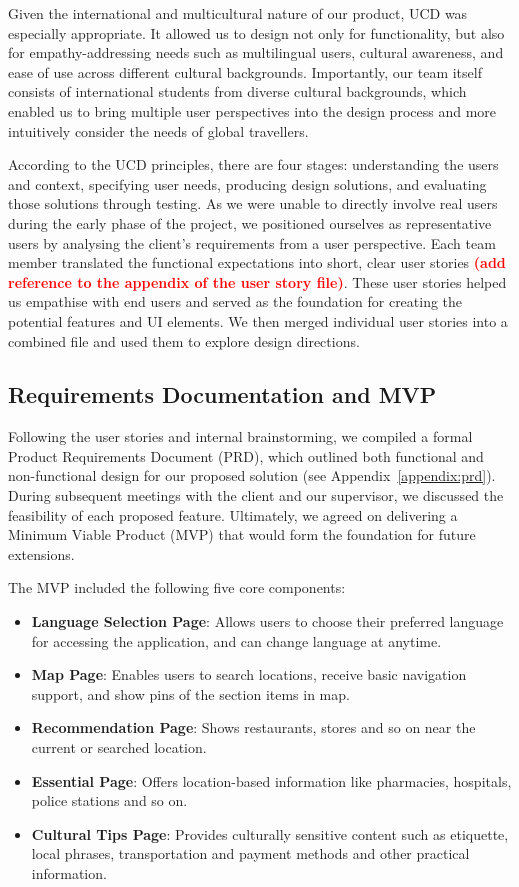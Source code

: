 Given the international and multicultural nature of our product, UCD was especially appropriate. It allowed us to design not only for functionality, but also for empathy-addressing needs such as multilingual users, cultural awareness, and ease of use across different cultural backgrounds. Importantly, our team itself consists of international students from diverse cultural backgrounds, which enabled us to bring multiple user perspectives into the design process and more intuitively consider the needs of global travellers.

According to the UCD principles, there are four stages: understanding the users and context, specifying user needs, producing design solutions, and evaluating those solutions through testing. As we were unable to directly involve real users during the early phase of the project, we positioned ourselves as representative users by analysing the client's requirements from a user perspective. Each team member translated the functional expectations into short, clear user stories \textbf{\textcolor{red}{(add reference to the appendix of the user story file)}}. These user stories helped us empathise with end users and served as the foundation for creating the potential features and UI elements. We then merged individual user stories into a combined file and used them to explore design directions.

\subsection{Requirements Documentation and MVP} 
Following the user stories and internal brainstorming, we compiled a formal Product Requirements Document (PRD), which outlined both functional and non-functional design for our proposed solution (see Appendix~\ref{appendix:prd}). During subsequent meetings with the client and our supervisor, we discussed the feasibility of each proposed feature. Ultimately, we agreed on delivering a Minimum Viable Product (MVP) that would form the foundation for future extensions. 

The MVP included the following five core components: 
\begin{itemize} 
    \item \textbf{Language Selection Page}: Allows users to choose their preferred language for accessing the application, and can change language at anytime. 
    \item \textbf{Map Page}: Enables users to search locations, receive basic navigation support, and show pins of the section items in map. 
    \item \textbf{Recommendation Page}: Shows restaurants, stores and so on near the current or searched location. 
    \item \textbf{Essential Page}: Offers location-based information like pharmacies, hospitals, police stations and so on. 
    \item \textbf{Cultural Tips Page}: Provides culturally sensitive content such as etiquette, local phrases, transportation and payment methods and other practical information. 
\end{itemize} 

